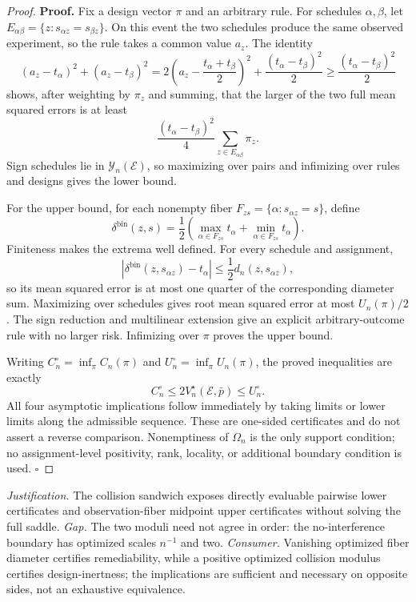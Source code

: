 \documentclass{article}
\begin{document}
\begin{proof}
\textbf{Proof.}
Fix a design vector \(\pi\) and an arbitrary rule. For schedules \(\alpha,\beta\), let \(E_{\alpha\beta}=\{z:s_{\alpha z}=s_{\beta z}\}\). On this event the two schedules produce the same observed experiment, so the rule takes a common value \(a_z\). The identity
\[
 (a_z-t_\alpha)^2+(a_z-t_\beta)^2
 =2\left(a_z-\frac{t_\alpha+t_\beta}{2}\right)^2
 +\frac{(t_\alpha-t_\beta)^2}{2}
 \ge\frac{(t_\alpha-t_\beta)^2}{2}
\]
shows, after weighting by \(\pi_z\) and summing, that the larger of the two full mean squared errors is at least
\[
 \frac{(t_\alpha-t_\beta)^2}{4}
 \sum_{z\in E_{\alpha\beta}}\pi_z.
\]
Sign schedules lie in \(\mathcal Y_n(\mathcal E)\), so maximizing over pairs and infimizing over rules and designs gives the lower bound.

For the upper bound, for each nonempty fiber \(F_{zs}=\{\alpha:s_{\alpha z}=s\}\), define
\[
 \delta^{\mathrm{bin}}(z,s)=\frac12
 \left(\max_{\alpha\in F_{zs}}t_\alpha+\min_{\alpha\in F_{zs}}t_\alpha\right).
\]
Finiteness makes the extrema well defined. For every schedule and assignment,
\[
 |\delta^{\mathrm{bin}}(z,s_{\alpha z})-t_\alpha|
 \le\frac12d_n(z,s_{\alpha z}),
\]
so its mean squared error is at most one quarter of the corresponding diameter sum. Maximizing over schedules gives root mean squared error at most \(U_n(\pi)/2\). The sign reduction and multilinear extension give an explicit arbitrary-outcome rule with no larger risk. Infimizing over \(\pi\) proves the upper bound.

Writing \(C_n^\circ=\inf_\pi C_n(\pi)\) and \(U_n^\circ=\inf_\pi U_n(\pi)\), the proved inequalities are exactly
\[
 C_n^\circ\le2V_n^\star(\mathcal E,\bar p)\le U_n^\circ.
\]
All four asymptotic implications follow immediately by taking limits or lower limits along the admissible sequence. These are one-sided certificates and do not assert a reverse comparison. Nonemptiness of \(\Omega_n\) is the only support condition; no assignment-level positivity, rank, locality, or additional boundary condition is used. \(\square\)
\end{proof}
\par\smallskip\noindent \textit{Justification.} The collision sandwich exposes directly evaluable pairwise lower certificates and observation-fiber midpoint upper certificates without solving the full saddle. \textit{Gap.} The two moduli need not agree in order: the no-interference boundary has optimized scales \(n^{-1}\) and two. \textit{Consumer.} Vanishing optimized fiber diameter certifies remediability, while a positive optimized collision modulus certifies design-inertness; the implications are sufficient and necessary on opposite sides, not an exhaustive equivalence.
\end{document}

